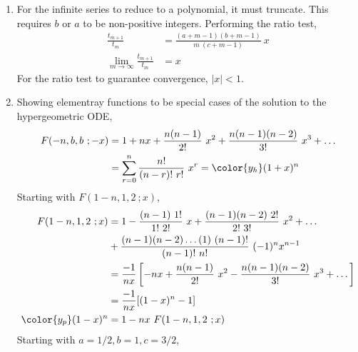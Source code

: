\begin{enumerate}
\begin{enumerate}
              \item For the infinite series to reduce to a polynomial, it must truncate.
                    This requires $ b $ or $ a $ to be non-positive integers.
                    Performing the ratio test,
                    \begin{align}
                        \frac{t_{m+1}}{t_m}                     &
                        = \frac{(a+m-1)(b+m-1)}{m\ (c+m-1)}\ x        \\
                        \lim_{m \to \infty} \frac{t_{m+1}}{t_m} & = x
                    \end{align}
                    For the ratio test to guarantee convergence, $ |x| < 1 $.

              \item Showing elementray functions to be special cases of the solution
                    to the hypergeometric ODE,
                    \begin{align}
                        F(-n,b,b\ ;-x) & = 1 + nx + \frac{n(n-1)}{2!}\ x^2 +
                        \frac{n(n-1)(n-2)}{3!}\ x^3 + \dots                          \\
                                       & = \sum_{r=0}^{n} \frac{n!}{(n-r)!\ r!}\ x^r
                        = \color{y_h} (1+x)^n
                    \end{align}
                    Starting with $ F(1-n,1,2\ ; x) $,
                    \begin{align}
                        F(1-n,1,2\ ;x)        & = 1 - \frac{(n-1)\ 1!}{1!\ 2!}\ x
                        + \frac{(n-1)(n-2)\ 2!}{2!\ 3!}\ x^2 + \dots                \\
                                              & + \frac{(n-1)(n-2)\dots(1)\ (n-1)!}
                        {(n-1)!\ n!}\ (-1)^n x^{n-1}                                \\
                                              & = \frac{-1}{nx} \left[ -nx
                            + \frac{n(n-1)}{2!}\ x^2
                        - \frac{n(n-1)(n-2)}{3!}\ x^3 + \dots \right]               \\
                                              & = \frac{-1}{nx} [ (1-x)^n - 1 ]     \\
                        {\color{y_p} (1-x)^n} & = 1 - nx\ F(1-n,1,2\ ;x)
                    \end{align}
                    Starting with $ a = 1/2, b = 1, c = 3/2 $,
                    \begin{align}

\end{align}
\end{enumerate}
\end{enumerate}
